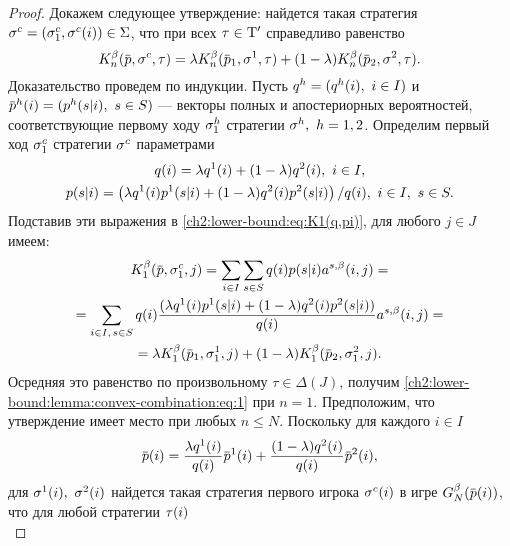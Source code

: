 {\begin{proof}
  Докажем следующее утверждение: найдется такая стратегия $\sigmar^c = (\sigmas[c]{1}, \sigmaran{c}{i}) \in \Sigma$, что при всех $\tau \in \mathrm{T}'$ справедливо равенство
  \begin{equation}
    \label{ch2:lower-bound:lemma:convex-combination:eq:1}
    \K{n}(\pd, \sigmar^c, \taur) =
    \lambda \K{n}(\pd_1, \sigmar^1, \taur) +
    (1-\lambda)\K{n}(\pd_2, \sigmar^2, \taur).
  \end{equation}
  Доказательство проведем по индукции.
  Пусть $q^{h} = (q^{h}(i),\ i \in I)$ и $\padn{h}{i} = (\pacn{h}{s}{i},\ s \in S)$ --- векторы полных и апостериорных вероятностей, соответствующие первому ходу $\sigmas[h]{1}$ стратегии $\sigma^h,\ h = 1, 2$.
  Определим первый ход $\sigmas[c]{1}$ стратегии $\sigma^c$ параметрами
  \begin{equation*}
    \begin{gathered}
      q(i) = \lambda q^{1}(i) + (1-\lambda) q^{2}(i),\ i \in I,                               \\
      p(s|i) = \left(
        \lambda q^{1}(i) p^{1}(s|i) + (1-\lambda) q^{2}(i) p^{2}(s|i)
      \right) / q(i),\ i \in I,\ s \in S.
    \end{gathered}
  \end{equation*}
  Подставив эти выражения в \eqref{ch2:lower-bound:eq:K1(q,pi)}, для любого $j \in J$ имеем:
  \begin{multline*}
    \K{1}(\pd, \sigmas[c]{1}, j) =
    \sum_{i \in I} \sum_{s \in S} \qc{i} \pac{s}{i} \as(i, j) =                               \\
    = \sum_{i \in I, \, s \in S}
    \qc{i} \frac{
      (\lambda \qcn{1}{i} \pacn{1}{s}{i} + (1-\lambda) \qcn{2}{i} \pacn{2}{s}{i})
    }{\qc{i}} \as(i,j) = \\
    = \lambda \K{1}(\pd_1, \sigmas[1]{1}, j) +
    (1-\lambda)\K{1}(\pd_2, \sigmas[2]{1}, j).
  \end{multline*}
  Осредняя это равенство по произвольному $\tau \in \Delta(J)$, получим \eqref{ch2:lower-bound:lemma:convex-combination:eq:1} при $n = 1$.
  Предположим, что утверждение имеет место при любых $n \leqslant N$.
  Поскольку для каждого $i \in I$
  \[
    \pad{i}
    = \frac{
      \lambda \qcn{1}{i}
    }{\qc{i}} \padn{1}{i}
    + \frac{
      (1-\lambda) \qcn{2}{i}
    }{\qc{i}} \padn{2}{i},
  \]
  для $\sigma^{1}(i),\ \sigma^{2}(i)$ найдется такая стратегия первого игрока $\sigma^{c}(i)$ в игре $\theG{N}(\pad{i})$, что для любой стратегии $\tau(i)$
  \begin{equation*}

\end{equation*}
\end{proof}}
